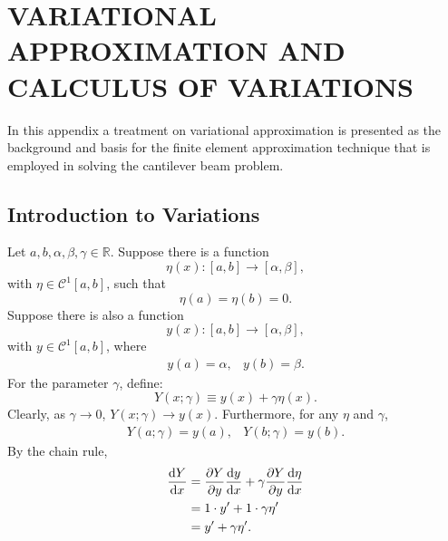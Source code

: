 \appendices
%
%

\chapter{VARIATIONAL APPROXIMATION AND CALCULUS OF VARIATIONS}
\label{app:variations}
In this appendix a treatment on variational approximation is presented as the background and basis for the finite element approximation technique that is employed in solving the cantilever beam problem.

\section{Introduction to Variations}
Let $a,b,\alpha,\beta,\gamma\in\mathbb R$. Suppose there is a function 
\begin{equation}
\eta(x):[a,b]\rightarrow[\alpha,\beta],
\end{equation}
with $\eta\in\mathcal C^1[a,b]$, such that
\begin{equation}
\eta(a) = \eta(b) = 0.
\end{equation}
Suppose there is also a function
\begin{equation}
y(x):[a,b]\rightarrow[\alpha,\beta],
\end{equation}
with $y\in\mathcal C^1[a,b]$, where
\begin{equation}
\begin{array}{rl}
y(a) = \alpha,&y(b) = \beta.
\end{array}
\end{equation}
For the parameter $\gamma$, define:
\begin{equation}
Y(x;\gamma) \equiv y(x)+\gamma\eta(x).
\end{equation}
Clearly, as $\gamma\rightarrow 0$, $Y(x;\gamma)\rightarrow y(x)$. Furthermore, for any $\eta$ and $\gamma$,
\begin{equation}
\begin{array}{rl}
Y(a;\gamma) = y(a),&Y(b;\gamma) = y(b).
\end{array}
\end{equation}
By the chain rule,
\begin{align}
\frac{\text dY}{\text dx} &= \frac{\partial Y}{\partial y}\frac{\text dy}{\text dx}+\gamma\frac{\partial Y}{\partial y}\frac{\text d\eta}{\text dx}\\
						  &= 1\cdot y'+1\cdot \gamma\eta'\\
						  &= y'+\gamma\eta'.
\end{align}
